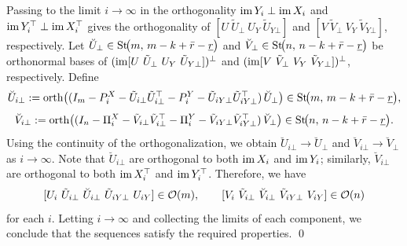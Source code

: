 Passing to the limit $i\to\infty$ in the orthogonality $\operatorname{im} Y_i\perp\operatorname{im} X_i$ and
$\operatorname{im} Y_i^\top\perp\operatorname{im} X_i^\top$ gives the orthogonality of $[U\ \tilde U_\bot\ U_Y\ \tilde U_{Y\bot}]$ and $[V\ \tilde V_\bot\ V_Y\ \tilde V_{Y\bot}]$, respectively. Let $\breve U_\bot\in\mathrm{St}\!\big(m,\,m-k+\bar{r}-{\underline{r}}\big)$ and
$\breve V_\bot\in\mathrm{St}\!\big(n,\,n-k+\bar{r}-{\underline{r}}\big)$ be orthonormal bases of $(\operatorname{im}[U\ \tilde U_\bot\ U_Y\ \tilde U_{Y\bot}])^\perp$ and $(\operatorname{im}[V\ \tilde V_\bot\ V_Y\ \tilde V_{Y\bot}])^\perp$, respectively. Define
\[
\breve U_{i\bot}:=\operatorname{orth}\!\big((I_m-P_i^X-\tilde{U}_{i\bot}\tilde{U}_{i\bot}^\top-P_i^Y-\tilde{U}_{iY\bot}\tilde{U}_{iY\bot}^\top)\,\breve U_\bot\big)
\in\mathrm{St}\!\big(m,\,m-k+\bar{r}-{\underline{r}}\big),
\]
\[
\breve V_{i\bot}:=\operatorname{orth}\!\big((I_n-\Pi_i^X-\tilde{V}_{i\bot}\tilde{V}_{i\bot}^\top-\Pi_i^Y-\tilde{V}_{iY\bot}\tilde{V}_{iY\bot}^\top)\,\breve V_\bot\big)
\in\mathrm{St}\!\big(n,\,n-k+\bar{r}-{\underline{r}}\big).
\]
Using the continuity of the orthogonalization, we obtain $\breve U_{i\bot}\to
\breve U_\bot$ and $\breve V_{i\bot}\to
\breve V_\bot$ as $i\to\infty$. Note that $\breve U_{i\bot}$ are orthogonal to
both $\operatorname{im} X_i$ and $\operatorname{im} Y_i$; similarly, $\breve V_{i\bot}$ are orthogonal to
both $\operatorname{im} X_i^\top$ and $\operatorname{im} Y_i^\top$. Therefore, we have
\[
[U_i\ \tilde U_{i\bot}\ \breve U_{i\bot}\ \tilde U_{iY\bot}\ U_{iY}]
\in\orth(m),
\qquad
[V_i\ \tilde V_{i\bot}\ \breve V_{i\bot}\ \tilde V_{iY\bot}\ V_{iY}]
\in\orth(n)
\]
for each $i$. Letting $i\to\infty$ and collecting the limits of each component, we conclude that the sequences satisfy the required properties. \qed

\vspace{1mm}




\printbibliography



